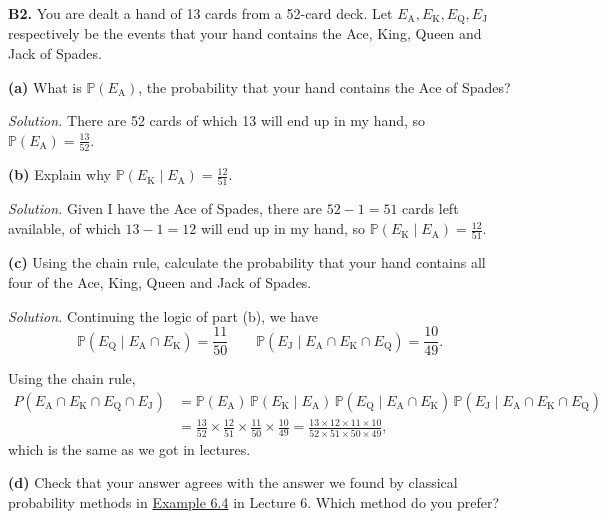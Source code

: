 \documentclass[
  a4paper,
]{book}
\theoremstyle{definition}
\theoremstyle{definition}
\theoremstyle{definition}
\theoremstyle{definition}
\theoremstyle{remark}
\begin{document}
\textbf{B2.} You are dealt a hand of 13 cards from a 52-card deck. Let \(E_\mathrm{A}, E_\mathrm{K}, E_\mathrm{Q}, E_\mathrm{J}\) respectively be the events that your hand contains the Ace, King, Queen and Jack of Spades.

\textbf{(a)} What is \(\mathbb P(E_\mathrm{A})\), the probability that your hand contains the Ace of Spades?

\begin{myanswers}
\emph{Solution.} There are 52 cards of which 13 will end up in my hand, so \(\mathbb P(E_\mathrm{A}) = \frac{13}{52}\).

\end{myanswers}

\textbf{(b)} Explain why \(\mathbb P(E_\mathrm{K} \mid E_\mathrm{A}) = \frac{12}{51}\).

\begin{myanswers}
\emph{Solution.} Given I have the Ace of Spades, there are \(52 - 1 = 51\) cards left available, of which \(13 - 1 = 12\) will end up in my hand, so \(\mathbb P(E_\mathrm{K} \mid E_\mathrm{A}) = \frac{12}{51}\).

\end{myanswers}

\textbf{(c)} Using the chain rule, calculate the probability that your hand contains all four of the Ace, King, Queen and Jack of Spades.

\begin{myanswers}
\emph{Solution.} Continuing the logic of part (b), we have
\[ \mathbb P(E_\mathrm{Q} \mid E_\mathrm{A} \cap E_\mathrm{K}) = \frac{11}{50} \qquad \mathbb P(E_\mathrm{J} \mid E_\mathrm{A} \cap E_\mathrm{K} \cap E_\mathrm{Q}) = \frac{10}{49} . \]

Using the chain rule,
\begin{align*}
P( E_\mathrm{A} \cap E_\mathrm{K} \cap E_\mathrm{Q} \cap E_\mathrm{J} )
  &= \mathbb P(E_\mathrm{A}) \, \mathbb P(E_\mathrm{K} \mid E_\mathrm{A}) \, \mathbb P(E_\mathrm{Q} \mid E_\mathrm{A} \cap E_\mathrm{K}) \, \mathbb P(E_\mathrm{J} \mid E_\mathrm{A} \cap E_\mathrm{K} \cap E_\mathrm{Q}) \\
  &= \frac{13}{52} \times \frac{12}{51} \times \frac{11}{50} \times \frac{10}{49} = \frac{13 \times 12 \times 11 \times 10}{52 \times 51 \times 50 \times 49} , 
\end{align*}
which is the same as we got in lectures.

\end{myanswers}

\textbf{(d)} Check that your answer agrees with the answer we found by classical probability methods in \href{L06-classical-ii.html\#exm:akqj}{Example 6.4} in Lecture 6. Which method do you prefer?
\end{document}
